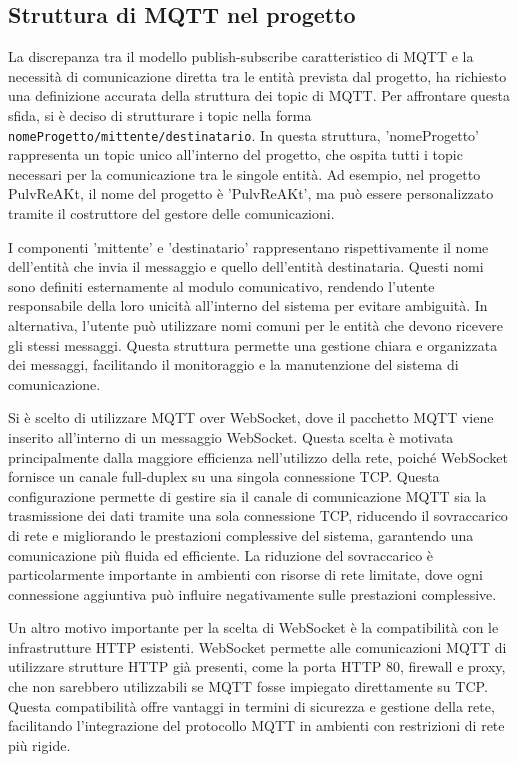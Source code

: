\documentclass[12pt,a4paper,openright,twoside]{book}
\begin{document}
\subsection{Struttura di MQTT nel progetto}

La discrepanza tra il modello publish-subscribe caratteristico di \ac{MQTT} e la necessità di comunicazione diretta tra le entità prevista dal progetto, ha richiesto 
una definizione accurata della struttura dei topic di \ac{MQTT}. Per affrontare questa sfida, si è deciso di strutturare i topic nella forma 
\texttt{nomeProgetto/mittente/destinatario}. 
In questa struttura, 'nomeProgetto' rappresenta un topic unico all'interno del progetto, che ospita tutti i topic necessari per la comunicazione tra le singole entità. 
Ad esempio, nel progetto PulvReAKt, il nome del progetto è 'PulvReAKt', ma può essere personalizzato tramite il costruttore del gestore delle comunicazioni.

I componenti 'mittente' e 'destinatario' rappresentano rispettivamente il nome dell'entità che invia il messaggio e quello dell'entità destinataria. 
Questi nomi sono definiti esternamente al modulo comunicativo, rendendo l'utente responsabile della loro unicità all'interno del sistema per evitare ambiguità. 
In alternativa, l'utente può utilizzare nomi comuni per le entità che devono ricevere gli stessi messaggi. Questa struttura permette una gestione chiara e organizzata dei messaggi, 
facilitando il monitoraggio e la manutenzione del sistema di comunicazione.

Si è scelto di utilizzare \ac{MQTT} over WebSocket, dove il pacchetto \ac{MQTT} viene inserito all'interno di un messaggio WebSocket. Questa scelta è motivata principalmente dalla 
maggiore efficienza nell'utilizzo della rete, poiché WebSocket fornisce un canale full-duplex su una singola connessione \ac{TCP}. Questa configurazione permette di gestire sia il 
canale di comunicazione \ac{MQTT} sia la trasmissione dei dati tramite una sola connessione \ac{TCP}, riducendo il sovraccarico di rete e migliorando le prestazioni complessive del sistema, 
garantendo una comunicazione più fluida ed efficiente. La riduzione del sovraccarico è particolarmente importante in ambienti con risorse di rete limitate, 
dove ogni connessione aggiuntiva può influire negativamente sulle prestazioni complessive.

Un altro motivo importante per la scelta di WebSocket è la compatibilità con le infrastrutture HTTP esistenti. WebSocket permette alle comunicazioni \ac{MQTT} di utilizzare strutture HTTP già presenti, 
come la porta HTTP 80, firewall e proxy, che non sarebbero utilizzabili se \ac{MQTT} fosse impiegato direttamente su \ac{TCP}. Questa compatibilità offre vantaggi in termini di sicurezza e gestione della rete, 
facilitando l'integrazione del protocollo \ac{MQTT} in ambienti con restrizioni di rete più rigide.
\end{document}
